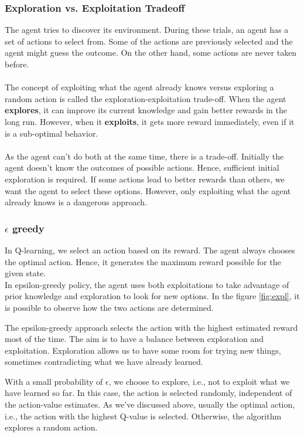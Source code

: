 \documentclass{article}
\begin{document}
\subsubsection{Exploration vs. Exploitation Tradeoff}
The agent tries to discover its environment. During these trials, an agent has a set of actions to select from. Some of the actions are previously selected and the agent might guess the outcome. On the other hand, some actions are never taken before.\\ \\
The concept of exploiting what the agent already knows versus exploring a random action is called the exploration-exploitation trade-off.
When the agent \textbf{explores}, it can improve its current knowledge and gain better rewards in the long run. However, when it \textbf{exploits}, it gets more reward immediately, even if it is a sub-optimal behavior.  \\ \\
As the agent can’t do both at the same time, there is a trade-off. Initially the agent doesn’t know the outcomes of possible actions. Hence, sufficient initial exploration is required. If some actions lead to better rewards than others, we want the agent to select these options. However, only exploiting what the agent already knows is a dangerous approach.

\subsubsection{$\epsilon$ greedy}
In Q-learning, we select an action based on its reward. The agent always chooses the optimal action. Hence, it generates the maximum reward possible for the given state.\\
In epsilon-greedy policy, the agent uses both exploitations to take advantage of prior knowledge and exploration to look for new options. In the figure \ref{fig:expl}, it is possible to observe how the two actions are determined.

The epsilon-greedy approach selects the action with the highest estimated reward most of the time. The aim is to have a balance between exploration and exploitation. Exploration allows us to have some room for trying new things, sometimes contradicting what we have already learned.  

With a small probability of $\epsilon$, we choose to explore, i.e., not to exploit what we have learned so far. In this case, the action is selected randomly, independent of the action-value estimates.
As we’ve discussed above, usually the optimal action, i.e., the action with the highest Q-value is selected. Otherwise, the algorithm explores a random action.
\end{document}
